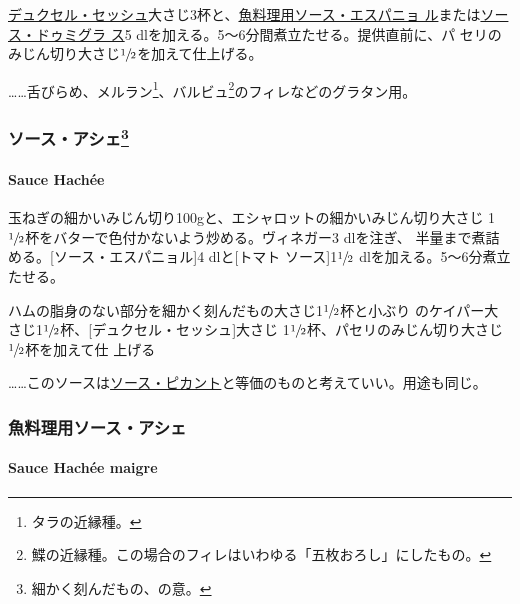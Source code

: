 \href{}{デュクセル・セッシュ}大さじ3杯と、\protect\hyperlink{sauce-espagnole-maigre}{魚料理用ソース・エスパニョ
ル}または\protect\hyperlink{sauce-demi-glace}{ソース・ドゥミグラ ス}5
dlを加える。5〜6分間煮立たせる。提供直前に、パ
セリのみじん切り大さじ\(\sfrac{1}{2}\)を加えて仕上げる。

\ldots{}\ldots{}舌びらめ、メルラン\footnote{タラの近縁種。}、バルビュ\footnote{鰈の近縁種。この場合のフィレはいわゆる「五枚おろし」にしたもの。}のフィレなどのグラタン用。

\maeaki

\hypertarget{ux30bdux30fcux30b9ux30a2ux30b7ux30a743}{%
\subsubsection[ソース・アシェ]{\texorpdfstring{ソース・アシェ\footnote{細かく刻んだもの、の意。}}{ソース・アシェ}}\label{ux30bdux30fcux30b9ux30a2ux30b7ux30a743}}

\hypertarget{sauce-hachee}{%
\paragraph{Sauce Hachée}\label{sauce-hachee}}


玉ねぎの細かいみじん切り100gと、エシャロットの細かいみじん切り大さじ
1\(\sfrac{1}{2}\)杯をバターで色付かないよう炒める。ヴィネガー3
dlを注ぎ、 半量まで煮詰める。{[}ソース・エスパニョル{]}4 dlと{[}トマト
ソース{]}1\(\sfrac{1}{2}\) dlを加える。5〜6分煮立たせる。

ハムの脂身のない部分を細かく刻んだもの大さじ1\(\sfrac{1}{2}\)杯と小ぶり
のケイパー大さじ1\(\sfrac{1}{2}\)杯、{[}デュクセル・セッシュ{]}大さじ
1\(\sfrac{1}{2}\)杯、パセリのみじん切り大さじ\(\sfrac{1}{2}\)杯を加えて仕
上げる

\ldots{}\ldots{}このソースは\protect\hyperlink{ux30bdux30fcux30b9ux30d4ux30abux30f3ux30c8}{ソース・ピカント}と等価のものと考えていい。用途も同じ。

\maeaki

\hypertarget{ux9b5aux6599ux7406ux7528ux30bdux30fcux30b9ux30a2ux30b7ux30a7}{%
\subsubsection{魚料理用ソース・アシェ}\label{ux9b5aux6599ux7406ux7528ux30bdux30fcux30b9ux30a2ux30b7ux30a7}}

\hypertarget{sauce-hachee-maigre}{%
\paragraph{Sauce Hachée maigre}\label{sauce-hachee-maigre}}

